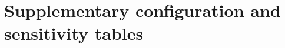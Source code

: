 \documentclass[preprint,12pt,numbers,sort&compress]{elsarticle}
\begin{document}



\clearpage
\appendix
\section{Supplementary configuration and sensitivity tables}
\label{sec:appendix}







\end{document}

